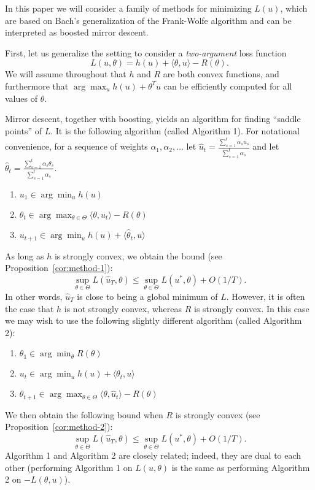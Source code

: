 \documentclass{article}
\begin{document}
In this paper we will consider a family of methods for minimizing $L(u)$, 
which are based on Bach's generalization of the Frank-Wolfe algorithm and can 
be interpreted as boosted mirror descent.

First, let us generalize the setting 
to consider a \emph{two-argument} loss function
\begin{equation}
L(u,\theta) = h(u) + \langle \theta, u \rangle - R(\theta).
\end{equation}
We will assume throughout that $h$ and $R$ are both convex functions, 
and furthermore that $\arg\max_{u} h(u) + \theta^Tu$ can be efficiently 
computed for all values of $\theta$.

Mirror descent, together with boosting, yields an algorithm for finding 
``saddle points'' of $L$. It is the following algorithm (called Algorithm 1).
For notational convenience, for a sequence of weights $\alpha_1,\alpha_2,\ldots$ 
let $\hat{u}_t = \frac{\sum_{s=1}^t \alpha_su_s}{\sum_{s=1}^t \alpha_s}$ and let 
$\hat{\theta}_t = \frac{\sum_{s=1}^t \alpha_s\theta_s}{\sum_{s=1}^t \alpha_s}$.
\begin{enumerate}
\item $u_1 \in \arg\min_u h(u)$
\item $\theta_{t} \in \arg\max_{\theta \in \Theta} \langle \theta, u_t \rangle - R(\theta)$
\item $u_{t+1} \in \arg\min_{u} h(u) + \langle \hat{\theta}_t, u \rangle$
\end{enumerate}
As long as $h$ is strongly convex, we obtain the 
bound (see Proposition~\ref{cor:method-1}):
\begin{equation}
\sup_{\theta \in \Theta} L(\hat{u}_T, \theta) \leq \sup_{\theta \in \Theta} L(u^*, \theta) + O(1/T).
\end{equation}
In other words, $\hat{u}_T$ is close to being a global minimum of $L$.
However, it is often the case that $h$ is not strongly convex, whereas $R$ is strongly convex. In this case 
we may wish to use the following slightly different algorithm (called Algorithm 2):
\begin{enumerate}
\item $\theta_1 \in \arg\min_{\theta} R(\theta)$
\item $u_t \in \arg\min_{u} h(u) + \langle \theta_t, u \rangle$
\item $\theta_{t+1} \in \arg\max_{\theta \in \Theta} \langle \theta, \hat{u}_t \rangle - R(\theta)$
\end{enumerate}
We then obtain the following bound 
when $R$ is strongly convex (see Proposition~\ref{cor:method-2}):
\[ \sup_{\theta \in \Theta} L(\hat{u}_T, \theta) \leq \sup_{\theta \in \Theta} L(u^*, \theta) + O(1/T). \]
Algorithm 1 and Algorithm 2 are closely related; indeed, they are dual to each other 
(performing Algorithm 1 on $L(u,\theta)$ is the same as performing Algorithm 2 on 
$-L(\theta,u)$).
\end{document}
